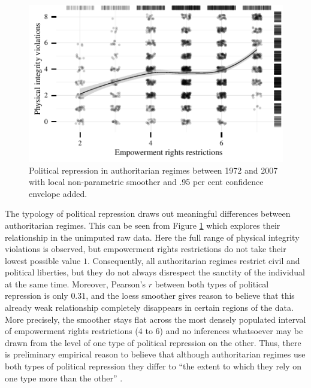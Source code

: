 \begin{figure}
\centering
\includegraphics[width=\linewidth]{./sections/02data/scatterRepression.pdf}
\caption[Political repression in authoritarian regimes between 1972 and 2007]{Political repression in authoritarian regimes between 1972 and 2007 with local non-parametric smoother and .95 per cent confidence envelope added.}
\label{fig:scatterRepression}
\end{figure}

The typology of political repression draws out meaningful
differences between authoritarian regimes. This can be seen 
from Figure \ref{fig:scatterRepression} which explores 
their relationship in the unimputed raw data. Here the 
full range of physical integrity violations is observed, 
but empowerment rights restrictions do not take
their lowest possible value $1$. Consequently, all 
authoritarian regimes restrict civil and political 
liberties, but they do not always disrespect the sanctity 
of the individual at the same time. Moreover, Pearson's $r$
between both types of political repression is only  
$0.31$, and the loess smoother gives reason to believe that 
this already weak relationship completely disappears in 
certain regions of the data. More precisely, the smoother 
stays flat across the most densely populated interval of 
empowerment rights restrictions ($4$ to $6$) and no 
inferences whatsoever may be drawn from the level of one 
type of political repression on the other. Thus, there is 
preliminary empirical reason to believe that although 
authoritarian regimes use both types of political 
repression they differ to ``the extent to which they rely 
on one type more than the other'' \citep[336]{Frantz.2014}.

